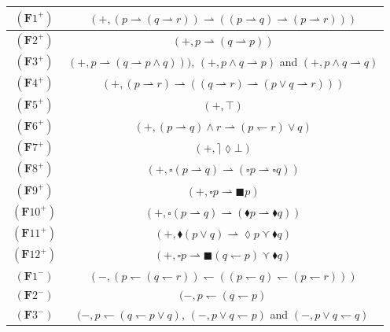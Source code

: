 \documentclass[draft]{article}
\def\Formula{\mathbf{A}}
\def\Formula{\mathbf{F}}
\begin{document}
\begin{table}[ht]
%
%
\begin{center}
%
%
\begin{tabular}{|c|c|}
%
%
\hline
%
%
$(\Formula1^{+})$&$(+,(p{\rightharpoonup}(q{\rightharpoonup}r)){\rightharpoonup}((p{\rightharpoonup}q){\rightharpoonup}(p{\rightharpoonup}r)))$
%
%
\\
%
%
\hline
%
%
$(\Formula2^{+})$&$(+,p{\rightharpoonup}(q{\rightharpoonup}p))$
%
%
\\
%
%
\hline
%
%
$(\Formula3^{+})$&$(+,p{\rightharpoonup}(q{\rightharpoonup}p{\wedge}q)))$, $(+,p{\wedge}q{\rightharpoonup}p)$ and $(+,p{\wedge}q{\rightharpoonup}q)$
%
%
\\
%
%
\hline
%
%
$(\Formula4^{+})$&$(+,(p{\rightharpoonup}r){\rightharpoonup}((q{\rightharpoonup}r){\rightharpoonup}(p{\vee}q{\rightharpoonup}r)))$
%
%
\\
%
%
\hline
%
%
$(\Formula5^{+})$&$(+,{\top})$
%
%
\\
%
%
\hline
%
%
$(\Formula6^{+})$&$(+,(p{\rightharpoonup}q){\wedge}r{\rightharpoonup}(p{\leftharpoondown}r){\vee}q)$
%
%
\\
%
%
\hline
%
%
$(\Formula7^{+})$&$(+,{\rceil}{\lozenge}{\bot})$
%
%
\\
%
%
\hline
%
%
$(\Formula8^{+})$&$(+,{\square}(p{\rightharpoonup}q){\rightharpoonup}({\square}p{\rightharpoonup}{\square}q))$
%
%
\\
%
%
\hline
%
%
$(\Formula9^{+})$&$(+,{\square}p{\rightharpoonup}{\blacksquare}p)$
%
%
\\
%
%
\hline
%
%
$(\Formula10^{+})$&$(+,{\square}(p{\rightharpoonup}q){\rightharpoonup}({\blacklozenge}p{\rightharpoonup}{\blacklozenge}q))$
%
%
\\
%
%
\hline
%
%
$(\Formula11^{+})$&$(+,{\blacklozenge}(p{\vee}q){\rightharpoonup}{\lozenge}p{\curlyvee}{\blacklozenge}q)$
%
%
\\
%
%
\hline
%
%
$(\Formula12^{+})$&$(+,{\square}p{\rightharpoonup}{\blacksquare}(q{\leftharpoondown}p){\curlyvee}{\blacklozenge}q)$
%
%
\\
%
%
\hline
%
%
$(\Formula1^{-})$&$(-,(p{\leftharpoondown}(q{\leftharpoondown}r)){\leftharpoondown}((p{\leftharpoondown}q){\leftharpoondown}(p{\leftharpoondown}r)))$
%
%
\\
%
%
\hline
%
%
$(\Formula2^{-})$&$(-,p{\leftharpoondown}(q{\leftharpoondown}p)$
%
%
\\
%
%
\hline
%
%
$(\Formula3^{-})$&$(-,p{\leftharpoondown}(q{\leftharpoondown}p{\vee}q)$, $(-,p{\vee}q{\leftharpoondown}p)$ and $(-,p{\vee}q{\leftharpoondown}q)$

\end{tabular}
\end{center}
\end{table}
\end{document}
